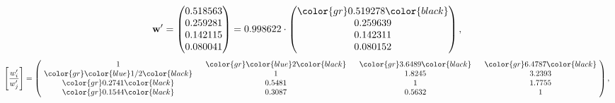 \begin{example}
\begin{equation*}
\mathbf{w}^{\prime} =
\begin{pmatrix}
0.518563\\
0.259281\\
0.142115\\
0.080041
\end{pmatrix} =
0.998622\cdot
\begin{pmatrix}
\color{gr} 0.519278\color{black} \\
0.259639\\
0.142311\\
0.080152
\end{pmatrix},
\end{equation*}
\begin{equation*}
\left[ \frac{{w}^{\prime}_i}{{w}^{\prime}_j} \right] =
\begin{pmatrix}
$\,\,$ 1 $\,\,$ & $\,\,$\color{gr} \color{blue} 2\color{black} $\,\,$ & $\,\,$\color{gr} 3.6489\color{black} $\,\,$ & $\,\,$\color{gr} 6.4787\color{black} $\,\,$ \\
$\,\,$\color{gr} \color{blue}  1/2\color{black} $\,\,$ & $\,\,$ 1 $\,\,$ & $\,\,$1.8245$\,\,$ & $\,\,$3.2393  $\,\,$ \\
$\,\,$\color{gr} 0.2741\color{black} $\,\,$ & $\,\,$0.5481$\,\,$ & $\,\,$ 1 $\,\,$ & $\,\,$1.7755 $\,\,$ \\
$\,\,$\color{gr} 0.1544\color{black} $\,\,$ & $\,\,$0.3087$\,\,$ & $\,\,$0.5632$\,\,$ & $\,\,$ 1  $\,\,$ \\
\end{pmatrix},
\end{equation*}
\end{example}
\newpage
